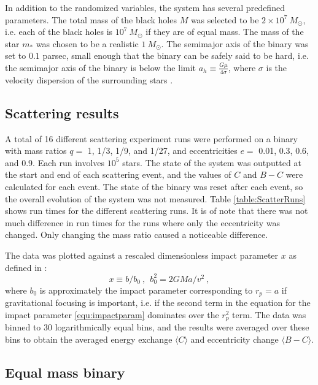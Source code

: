\documentclass[english, oneside]{HYgradu}
\begin{document}
In addition to the randomized variables, the system has several predefined parameters. The total mass of the black holes $M$ was selected to be  $2 \times 10^7 \ M_{\odot}$, i.e. each of the black holes is $10^7 \ M_{\odot}$ if they are of equal mass. The mass of the star $m_{\ast}$ was chosen to be a realistic $1 \ M_{\odot}$. The semimajor axis of the binary was set to $0.1$ parsec, small enough that the binary can be safely said to be hard, i.e. the semimajor axis of the binary is below the limit $a_h \equiv \frac{G \mu}{4 \sigma}$, where $\sigma$ is the velocity dispersion of the surrounding stars \citep{merrit:nuclei}. 

\subsection{Scattering results}

A total of 16 different scattering experiment runs were performed on a binary with mass ratios $q =$ 1, 1/3, 1/9, and 1/27, and eccentricities  $e =$ 0.01, 0.3, 0.6, and 0.9. Each run involves $10^5$ stars. The state of the system was outputted at the start and end of each scattering event, and the values of $C$ and $B-C$ were calculated for each event. The state of the binary was reset after each event, so the overall evolution of the system was not measured. Table \ref{table:ScatterRuns} shows run times for the different scattering runs. It is of note that there was not much difference in run times for the runs where only the eccentricity was changed. Only changing the mass ratio caused a noticeable difference.

The data was plotted against a rescaled dimensionless impact parameter $x$ as defined in \cite{quinlan:1996}:
\begin{equation}
x \equiv b/b_0 \ , \ \ b_0^2 = 2GMa/v^2 \ ,
\end{equation}
where $b_0$ is approximately the impact parameter corresponding to $r_p = a$ if gravitational focusing is important, i.e. if the second term in the equation for the impact parameter \eqref{equ:impactparam} dominates over the $r_p^2$ term. The data was binned to 30 logarithmically equal bins, and the results were averaged over these bins to obtain the averaged energy exchange $\langle C \rangle$ and eccentricity change $\langle B-C \rangle$.

\subsection{Equal mass binary}
\end{document}
